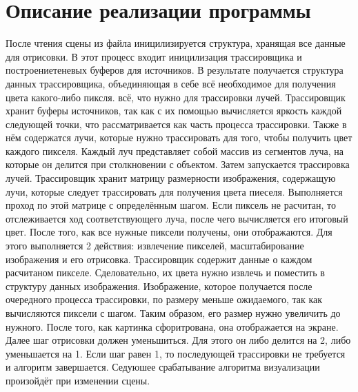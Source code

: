 \section{Описание реализации программы} {
    После чтения сцены из файла иницилизируется структура,
    хранящая все данные для отрисовки.
    В этот процесс входит иницилизация трассировщика
    и построениетеневых буферов для источников.
    В результате получается структура данных трассировщика,
    объединяющая в себе всё необходимое для получения цвета какого-либо пиксля.
    всё, что нужно для трассировки лучей.
    Трассировщик хранит буферы источников, так как с их помощью вычисляется
    яркость каждой следующей точки, что рассматривается как часть процесса
    трассировки.
    Также в нём содержатся лучи, которые нужно трассировать для того, чтобы
    получить цвет каждого пикселя.
    Каждый луч представляет собой массив из сегментов луча, на которые
    он делится при столкновении с объектом.
    Затем запускается трассировка лучей.
    Трассировщик хранит матрицу размерности изображения, содержащую
    лучи, которые следует трассировать для получения цвета пиеселя.
    Выполняется проход по этой матрице с определённым шагом.
    Если пиксель не расчитан, то отслеживается ход соответствующего луча,
    после чего вычисляется его итоговый цвет.
    После того, как все нужные пиксели получены, они отображаются.
    Для этого выполняется 2 действия: извлечение пикселей,
    масштабирование изображения и его отрисовка.
    Трассировщик содержит данные о каждом расчитаном пикселе.
    Сделовательно, их цвета нужно извлечь и поместить в
    структуру данных изображения.
    Изображение, которое получается после очередного процесса трассировки,
    по размеру меньше ожидаемого, так как вычисляются пиксели с шагом.
    Таким образом, его размер нужно увеличить до нужного.
    После того, как картинка сфоритрована, она отображается на экране.
    Далее шаг отрисовки должен уменьшиться.
    Для этого он либо делится на 2, либо уменьшается на 1.
    Если шаг равен 1, то последующей трассировки не требуется
    и алгоритм завершается.
    Седуюшее срабатывание алгоритма визуализации произойдёт
    при изменении сцены.
    
}
